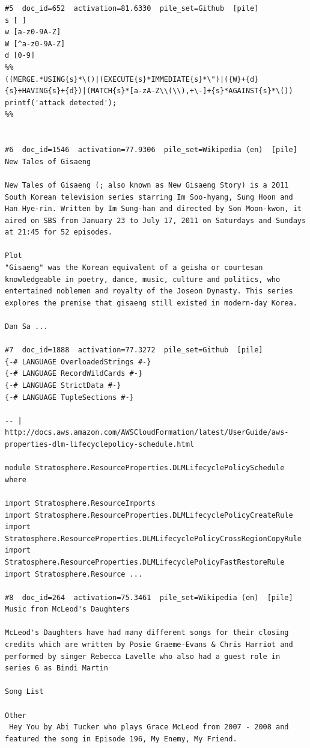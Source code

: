\begin{verbatim}
#5  doc_id=652  activation=81.6330  pile_set=Github  [pile]
s [ ]
w [a-z0-9A-Z]
W [^a-z0-9A-Z]
d [0-9]
%%
((MERGE.*USING{s}*\()|(EXECUTE{s}*IMMEDIATE{s}*\")|({W}+{d}{s}+HAVING{s}+{d})|(MATCH{s}*[a-zA-Z\\(\\),+\-]+{s}*AGAINST{s}*\()) printf('attack detected');
%%


#6  doc_id=1546  activation=77.9306  pile_set=Wikipedia (en)  [pile]
New Tales of Gisaeng

New Tales of Gisaeng (; also known as New Gisaeng Story) is a 2011 South Korean television series starring Im Soo-hyang, Sung Hoon and Han Hye-rin. Written by Im Sung-han and directed by Son Moon-kwon, it aired on SBS from January 23 to July 17, 2011 on Saturdays and Sundays at 21:45 for 52 episodes.

Plot
"Gisaeng" was the Korean equivalent of a geisha or courtesan knowledgeable in poetry, dance, music, culture and politics, who entertained noblemen and royalty of the Joseon Dynasty. This series explores the premise that gisaeng still existed in modern-day Korea.

Dan Sa ...

#7  doc_id=1888  activation=77.3272  pile_set=Github  [pile]
{-# LANGUAGE OverloadedStrings #-}
{-# LANGUAGE RecordWildCards #-}
{-# LANGUAGE StrictData #-}
{-# LANGUAGE TupleSections #-}

-- | http://docs.aws.amazon.com/AWSCloudFormation/latest/UserGuide/aws-properties-dlm-lifecyclepolicy-schedule.html

module Stratosphere.ResourceProperties.DLMLifecyclePolicySchedule where

import Stratosphere.ResourceImports
import Stratosphere.ResourceProperties.DLMLifecyclePolicyCreateRule
import Stratosphere.ResourceProperties.DLMLifecyclePolicyCrossRegionCopyRule
import Stratosphere.ResourceProperties.DLMLifecyclePolicyFastRestoreRule
import Stratosphere.Resource ...

#8  doc_id=264  activation=75.3461  pile_set=Wikipedia (en)  [pile]
Music from McLeod's Daughters

McLeod's Daughters have had many different songs for their closing credits which are written by Posie Graeme-Evans & Chris Harriot and performed by singer Rebecca Lavelle who also had a guest role in series 6 as Bindi Martin

Song List

Other
 Hey You by Abi Tucker who plays Grace McLeod from 2007 - 2008 and featured the song in Episode 196, My Enemy, My Friend.


\end{verbatim}
